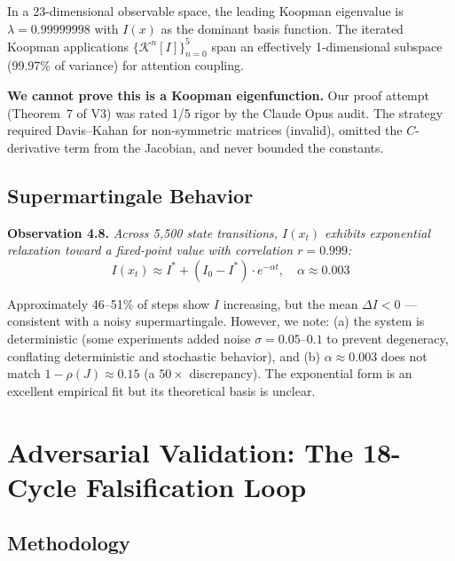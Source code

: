 \documentclass[11pt]{article}
\begin{document}
In a 23-dimensional observable space, the leading Koopman eigenvalue is $\lambda = 0.99999998$ with $I(x)$ as the dominant basis function. The iterated Koopman applications $\{\mathcal{K}^n[I]\}_{n=0}^5$ span an effectively 1-dimensional subspace (99.97\% of variance) for attention coupling.

\textbf{We cannot prove this is a Koopman eigenfunction.} Our proof attempt (Theorem~7 of V3) was rated 1/5 rigor by the Claude Opus audit. The strategy required Davis--Kahan for non-symmetric matrices (invalid), omitted the $C$-derivative term from the Jacobian, and never bounded the constants.

\subsection{Supermartingale Behavior}

\textbf{Observation 4.8.} \textit{Across 5{,}500 state transitions, $I(x_t)$ exhibits exponential relaxation toward a fixed-point value with correlation $r = 0.999$:}
\begin{equation}
  I(x_t) \approx I^* + (I_0 - I^*) \cdot e^{-\alpha t}, \quad \alpha \approx 0.003
\end{equation}

Approximately 46--51\% of steps show $I$ increasing, but the mean $\Delta I < 0$ --- consistent with a noisy supermartingale. However, we note: (a) the system is deterministic (some experiments added noise $\sigma = 0.05$--$0.1$ to prevent degeneracy, conflating deterministic and stochastic behavior), and (b) $\alpha \approx 0.003$ does not match $1 - \rho(J) \approx 0.15$ (a $50\times$ discrepancy). The exponential form is an excellent empirical fit but its theoretical basis is unclear.

\section{Adversarial Validation: The 18-Cycle Falsification Loop}

\subsection{Methodology}
\end{document}
